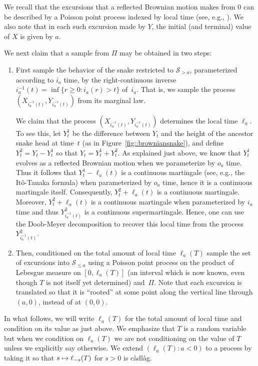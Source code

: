 \documentclass[10pt]{amsart}
\let\mathcal\mathscr
\newcommand\mto{\mathchoice{\longmapsto}{\mapsto}{\mapsto}{\mapsto}}
\theoremstyle{plain}
\numberwithin{theorem}{section}
\theoremstyle{definition}
\newcommand{\snake}{{\mathcal S}}
\newcommand{\cadlag}{càdlàg}
\let\snakeexcursionmeasure \Pi
\begin{document}
We recall that the excursions that a reflected Brownian motion makes from $0$ can be described by a Poisson point process indexed by local time (see, e.g., \cite[Chap.\,VI]{ry99martingales}). We also note that in each such excursion made by $Y$, the initial (and terminal) value of $X$ is given by $a$.

We next claim that a sample from $\snakeexcursionmeasure$ may be obtained in two steps:
\begin{enumerate}
\item First sample the behavior of the snake restricted to $\snake_{>a}$, parameterized according to $i_a$ time, \ie by the right-continuous inverse $i_a^{-1}(t) = \inf\{r\!\geq\!0 : i_a(r)\!>\!t\}$ of~$i_a$. That is, we sample the process $(X_{i_a^{-1}(t)}, Y_{i_a^{-1}(t)})$ from its marginal law.

We claim that the process $(X_{i_a^{-1}(t)},Y_{i_a^{-1}(t)})$ determines the local time $\ell_a$. To see this, let $Y^1_t$ be the difference between $Y_t$ and the height of the ancestor snake head at time~$t$ (as in Figure~\ref{fig::browniansnake}), and define $Y^2_t = Y_t - Y^1_t$ so that $Y_t = Y^1_t + Y^2_t$. As explained just above, we know that $Y_t^1$ evolves as a reflected Brownian motion when we parameterize by $o_a$ time. Thus it follows that $Y^1_t - \ell_a(t)$ is a continuous martingale (see, e.g., the Itô-Tanaka formula) when parameterized by $o_a$ time, hence it is a continuous martingale itself. Consequently, $Y^2_t + \ell_a(t)$ is a continuous martingale. Moreover, $Y_t^2 + \ell_a(t)$ is a continuous martingale when parameterized by $i_a$ time and thus $Y_{i_a^{-1}(t)}^2$ is a continuous supermartingale. Hence, one can use the Doob-Meyer decomposition to recover this local time from the process $Y_{i_a^{-1}(t)}^2$.
\item Then, conditioned on the total amount of local time $\ell_a(T)$ sample the set of excursions into $\snake_{\leq a}$ using a Poisson point process on the product of Lebesgue measure on $[0,\ell_a(T)]$ (an interval which is now known, even though $T$ is not itself yet determined) and~$\snakeexcursionmeasure$. Note that each excursion is translated so that it is ``rooted'' at some point along the vertical line through $(a,0)$, instead of at $(0,0)$.
\end{enumerate}

In what follows, we will write $\ell_a(T)$ for the total amount of local time and condition on its value as just above. We emphasize that $T$ is a random variable but when we condition on $\ell_a(T)$ we are not conditioning on the value of $T$ unless we explicitly say otherwise. We extend $(\ell_a(T) : a < 0)$ to a process by taking it so that $s \mto \ell_{-s}(T)$ for $s > 0$ is {\cadlag}.
\end{document}
